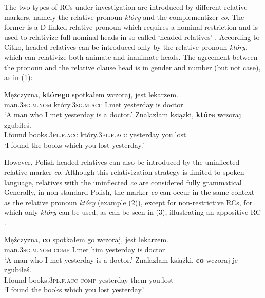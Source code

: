 \documentclass[output=paper]{langsci/langscibook}
\begin{document}
The two types of RCs under investigation are introduced by different relative markers, namely the relative pronoun \textit{który} and the complementizer \textit{co}. The former is a D-linked relative pronoun which requires a nominal restriction and is used to relativize full nominal heads in so-called ‘headed relatives’ \citep{Citko2004}. According to Citko, headed relatives can be introduced only by the relative pronoun \textit{który}, which can relativize both animate and inanimate heads. The agreement between the pronoun and the relative clause head is in gender and number (but not case), as in (1): 

\ea%
    \label{ex:leska:1}
    \ea
    \gll Mężczyzna, \textbf{którego} spotkałem wczoraj, jest lekarzem.\\
         man.\textsc{3sg.m.nom} który.\textsc{3sg.m.acc} I.met yesterday is doctor\\
    \glt ‘A man who I met yesterday is a doctor.’
\ex
    \gll Znalazłam   książki, \textbf{które}   wczoraj zgubiłeś. \\
         I.found books.\textsc{3pl.f.acc} który.\textsc{3pl.f.acc} yesterday you.lost\\
    \glt ‘I found the books which you lost yesterday.’
    \z
\z    

However, Polish headed relatives can also be introduced by the uninflected relative marker \textit{co}. Although this relativization strategy is limited to spoken language, relatives with the uninflected \textit{co} are considered fully grammatical \citep{Buttler1971}. Generally, in non-standard Polish, the marker \textit{co} can occur in the same context as the relative pronoun \textit{który} (example (2)), except for non-restrictive RCs, for which only \textit{który} can be used, as can be seen in (3), illustrating an appositive RC \citep{Borsley1981,1984}.

\ea%
    \label{ex:leska:2}
    \ea
    \gll Mężczyzna, \textbf{co} spotkałem go wczoraj, jest lekarzem.\\
         man.\textsc{3sg.m.nom} \textsc{comp} I.met him yesterday is doctor\\
    \glt ‘A man who I met yesterday is a doctor.’
    \ex
    \gll Znalazłam   książki, \textbf{co} wczoraj   je zgubiłeś. \\
         I.found books.\textsc{3pl.f.acc} \textsc{comp}\textsubscript{} yesterday them you.lost\\
    \glt ‘I found the books which you lost yesterday.’
    \z
\z    
\end{document}
